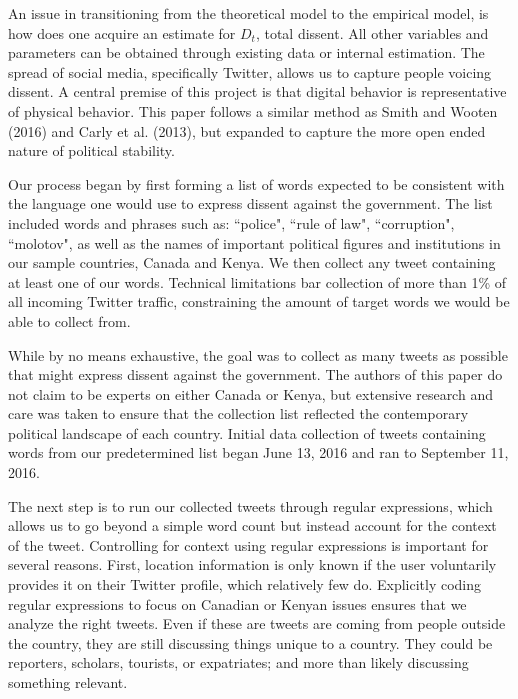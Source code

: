 \documentclass[12pt]{article}
\begin{document}
\begin{spacing}{1.5}
An issue in transitioning from the theoretical model to the empirical model, is how does one acquire an estimate for $D_t$, total dissent. All other variables and parameters can be obtained through existing data or internal estimation. The spread of social media, specifically Twitter, allows us to capture people voicing dissent. A central premise of this project is that digital behavior is representative of physical behavior. This paper follows a similar method as Smith and Wooten (2016) and Carly et al. (2013), but expanded to capture the more open ended nature of political stability. 


Our process began by first forming a list of words expected to be consistent with the language one would use to express dissent against the government. The list included words and phrases such as: ``police", ``rule of law", ``corruption", ``molotov", as well as the names of important political figures and institutions in our sample countries, Canada and Kenya. We then collect any tweet containing at least one of our words. Technical limitations bar collection of more than 1\% of all incoming Twitter traffic, constraining the amount of target words we would be able to collect from. 

While by no means exhaustive, the goal was to collect as many tweets as possible that might express dissent against the government. The authors of this paper do not claim to be experts on either Canada or Kenya, but extensive research and care was taken to ensure that the collection list reflected the contemporary political landscape of each country. Initial data collection of tweets containing words from our predetermined list began June 13, 2016 and ran to September 11, 2016. 


The next step is to run our collected tweets through regular expressions, which allows us to go beyond a simple word count but instead account for the context of the tweet. Controlling for context using regular expressions is important for several reasons. First, location information is only known if the user voluntarily provides it on their Twitter profile, which relatively few do. Explicitly coding regular expressions to focus on Canadian or Kenyan issues ensures that we analyze the right tweets. Even if these are tweets are coming from people outside the country, they are still discussing things unique to a country. They could be reporters, scholars, tourists, or expatriates; and more than likely discussing something relevant.    


\end{spacing}
\end{document}
